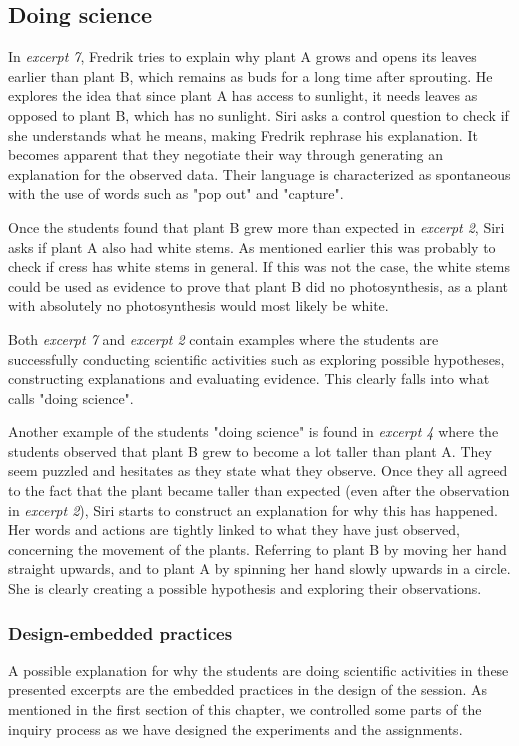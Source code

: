 \subsection{Doing science}
In \emph{excerpt 7}, Fredrik tries to explain why plant A grows and opens its leaves earlier than plant B, which remains as buds for a long time after sprouting. He explores the idea that since plant A has access to sunlight, it needs leaves as opposed to plant B, which has no sunlight. Siri asks a control question to check if she understands what he means, making Fredrik rephrase his explanation. It becomes apparent that they negotiate their way through generating an explanation for the observed data. Their language is characterized as spontaneous \citep{vygotsky2012thought} with the use of words such as "pop out" and "capture". 

Once the students found that plant B grew more than expected in \emph{excerpt 2}, Siri asks if plant A also had white stems. As mentioned earlier this was probably to check if cress has white stems in general. If this was not the case, the white stems could be used as evidence to prove that plant B did no photosynthesis, as a plant with absolutely no photosynthesis would most likely be white. 

Both \emph{excerpt 7} and \emph{excerpt 2} contain examples where the students are successfully conducting scientific activities such as exploring possible hypotheses, constructing explanations and evaluating evidence. This clearly falls into what \citet{jimenez2000doing} calls "doing science".

Another example of the students "doing science" is found in \emph{excerpt 4} where the students observed that plant B grew to become a lot taller than plant A. They seem puzzled and hesitates as they state what they observe. Once they all agreed to the fact that the plant became taller than expected (even after the observation in \emph{excerpt 2}), Siri starts to construct an explanation for why this has happened. Her words and actions are tightly linked to what they have just observed, concerning the movement of the plants. Referring to plant B by moving her hand straight upwards, and to plant A by spinning her hand slowly upwards in a circle. She is clearly creating a possible hypothesis and exploring their observations. 

\subsubsection{Design-embedded practices}
A possible explanation for why the students are doing scientific activities in these presented excerpts are the embedded practices in the design of the session. As mentioned in the first section of this chapter, we controlled some parts of the inquiry process as we have designed the experiments and the assignments. 

